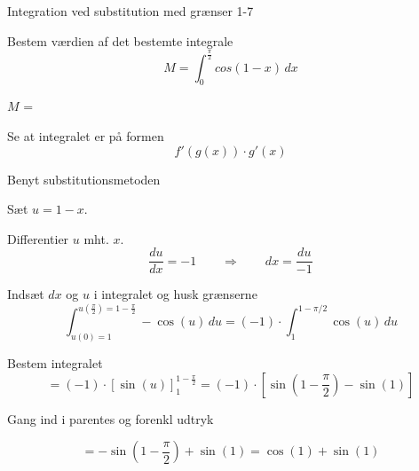 \documentclass{article}
\begin{document}
\begin{exercise}{Integration ved substitution med grænser 1-7}


Bestem værdien af det bestemte integrale
\[
M = \int_0^{\frac{\pi}{2}} cos(1 - x) \, dx
\]

$M$ = 



\hint

Se at integralet er på formen
\[
f'(g(x)) \cdot g'(x)
\]

\hint

Benyt substitutionsmetoden

\hint

Sæt $u=1 - x$.


\hint

Differentier $u$ mht. $x$.
\[
\frac{du}{dx} = -1 \qquad\Rightarrow \qquad dx = \frac{du}{-1}
\]

\hint

Indsæt $dx$ og $u$ i integralet og husk grænserne
\[
\int_{u(0)=1}^{u(\frac{\pi}{2})=1 - \frac{\pi}{2}} - \cos(u) \, du = (-1) \cdot \int_1^{1 - \pi/2} \cos(u) \, du
\]

\hint

Bestem integralet
\[
= (-1) \cdot \left[ \sin(u) \right]_1^{1 - \frac{\pi}{2}} = (-1) \cdot \left[ \sin\left(1 - \frac{\pi}{2}\right) - \sin(1) \right]
\]


\hint

Gang ind i parentes og forenkl udtryk

\hint

\[
= - \sin\left(1 - \frac{\pi}{2}\right) + \sin(1) = \cos(1) + \sin(1)
\]


\end{exercise}

\newpage
\end{document}
